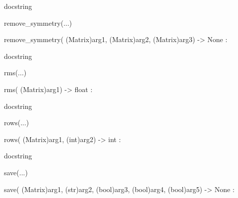 \documentclass[letterpaper,10pt,english]{sphinxmanual}
\begin{document}
\begin{description}
\begin{description}
\begin{DUlineblock}{0em}
\begin{DUlineblock}{\DUlineblockindent}
\begin{DUlineblock}{\DUlineblockindent}
\item[] docstring
\item[] 
\end{DUlineblock}
\end{DUlineblock}
\item[] remove\_symmetry(...)
\item[]
\begin{DUlineblock}{\DUlineblockindent}
\item[] remove\_symmetry( (Matrix)arg1, (Matrix)arg2, (Matrix)arg3) -\textgreater{} None :
\item[]
\begin{DUlineblock}{\DUlineblockindent}
\item[] docstring
\item[] 
\end{DUlineblock}
\end{DUlineblock}
\item[] rms(...)
\item[]
\begin{DUlineblock}{\DUlineblockindent}
\item[] rms( (Matrix)arg1) -\textgreater{} float :
\item[]
\begin{DUlineblock}{\DUlineblockindent}
\item[] docstring
\item[] 
\end{DUlineblock}
\end{DUlineblock}
\item[] rows(...)
\item[]
\begin{DUlineblock}{\DUlineblockindent}
\item[] rows( (Matrix)arg1, (int)arg2) -\textgreater{} int :
\item[]
\begin{DUlineblock}{\DUlineblockindent}
\item[] docstring
\item[] 
\end{DUlineblock}
\end{DUlineblock}
\item[] save(...)
\item[]
\begin{DUlineblock}{\DUlineblockindent}
\item[] save( (Matrix)arg1, (str)arg2, (bool)arg3, (bool)arg4, (bool)arg5) -\textgreater{} None :
\item[]
\begin{DUlineblock}{\DUlineblockindent}

\end{DUlineblock}
\end{DUlineblock}
\end{DUlineblock}
\end{description}
\end{description}
\end{document}

